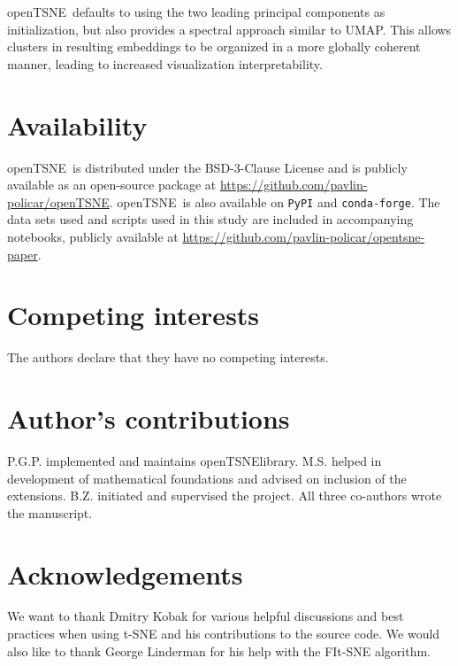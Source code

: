 \documentclass[twocolumn]{bmcart}
\newcommand{\opentsne}{\textsf{openTSNE}}
\begin{document}
\opentsne\ defaults to using the two leading principal components as
initialization, but also provides a spectral approach similar to UMAP.  This
allows clusters in resulting embeddings to be organized in a more globally
coherent manner, leading to increased visualization interpretability.

\section*{Availability}

\opentsne\ is distributed under the BSD-3-Clause License and is publicly
available as an open-source package at
\url{https://github.com/pavlin-policar/openTSNE}. \opentsne\ is also available
on \texttt{PyPI} and \texttt{conda-forge}. The data sets used and scripts used
in this study are included in accompanying notebooks, publicly available at
\url{https://github.com/pavlin-policar/opentsne-paper}.

\begin{backmatter}

\section*{Competing interests}
The authors declare that they have no competing interests.

\section*{Author's contributions}
P.G.P. implemented and maintains \opentsne library. M.S. helped in development
of mathematical foundations and advised on inclusion of the extensions.
B.Z. initiated and supervised the project. All three co-authors wrote
the manuscript.

\section*{Acknowledgements}
We want to thank Dmitry Kobak for various helpful discussions and best practices
when using t-SNE and his contributions to the source code. We would also
like to thank George Linderman for his help with the FIt-SNE algorithm.


\end{backmatter}
\end{document}
